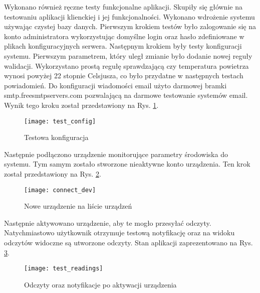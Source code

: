 Wykonano również ręczne testy funkcjonalne aplikacji. Skupiły się głównie na testowaniu aplikacji klienckiej
i jej funkcjonalności. Wykonano wdrożenie systemu używając czystej bazy danych. Pierwszym krokiem
testów było zalogowanie się na konto administratora wykorzystując domyślne login oraz hasło
zdefiniowane w plikach konfiguracyjnych serwera. Następnym krokiem były testy konfiguracji systemu.
Pierwszym parametrem, który uległ zmianie było dodanie nowej reguły walidacji. Wykorzystano
prostą regułę sprawdzającą czy temperatura powietrza wynosi powyżej 22 stopnie Celsjusza, co było
przydatne w następnych testach powiadomień. Do konfiguracji wiadomości email użyto darmowej
bramki smtp.freesmtpservers.com pozwalającą na darmowe testowanie systemów email. 
Wynik tego kroku został przedstawiony na Rys. \ref{test:config}.
\begin{figure}[h!]
  \centering
  \texttt{[image: test\_config]}
  \caption{Testowa konfiguracja}
  \label{test:config}
\end{figure}
Następnie podłączono urządzenie monitorujące parametry środowiska do systemu. Tym samym zostało
stworzone nieaktywne konto urządzenia. Ten krok został przedstawiony na Rys. \ref{test:connect_dev}.
\begin{figure}[h!]
  \centering
  \texttt{[image: connect\_dev]}
  \caption{Nowe urządzenie na liście urządzeń}
  \label{test:connect_dev}
\end{figure}
Następnie aktywowano urządzenie, aby te mogło przesyłać odczyty. Natychmiastowo użytkownik
otrzymuje testową notyfikację oraz na widoku odczytów widoczne są utworzone odczyty.
Stan aplikacji zaprezentowano na Rys. \ref{test:readings}.
\begin{figure}[h!]
  \centering
  \texttt{[image: test\_readings]}
  \caption{Odczyty oraz notyfikacje po aktywacji urządzenia}
  \label{test:readings}
\end{figure}
